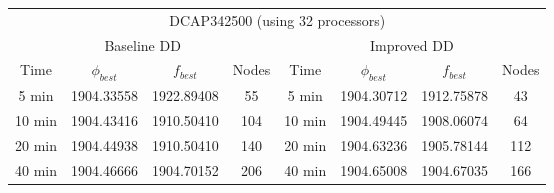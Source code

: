\begin{footnotesize}
\medskip
\begin{tabular}{cccc|cccc}
\multicolumn{8}{c}{DCAP342500 (using 32 processors)}\\
\multicolumn{4}{c}{Baseline DD} & \multicolumn{4}{c}{Improved DD}\\
Time & $\phi_{best}$ & $f_{best}$ & Nodes & Time & $\phi_{best}$ & $f_{best}$ & Nodes \\
\hline
5 min &   1904.33558 & 1922.89408 & 55 & 5 min & 1904.30712 & 1912.75878 & 43 \\
10 min & 1904.43416 & 1910.50410 & 104 & 10 min & 1904.49445 & 1908.06074 & 64 \\
20 min & 1904.44938 & 1910.50410 & 140 & 20 min & 1904.63236 & 1905.78144 & 112\\
40 min & 1904.46666 & 1904.70152 & 206 & 40 min & 1904.65008 & 1904.67035 & 166
\end{tabular}


\end{footnotesize}



